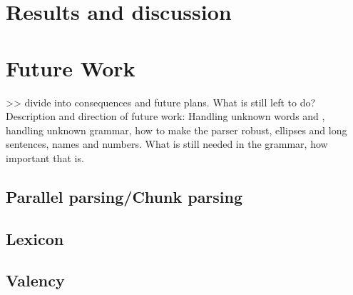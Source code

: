 \documentclass{report}
\begin{document}
\section{Results and discussion}
%
%


\section{Future Work}
\label{sec:future}
>> divide into consequences and future plans.
What is still left to do? Description and direction of future work:
Handling unknown words and , handling unknown grammar, 
how to make the parser robust, ellipses and long sentences, names and numbers.
What is still needed in the grammar, how important that is. 
\subsection{Parallel parsing/Chunk parsing}
\subsection{Lexicon}


\subsection{Valency}
\label{sec:futureValency}
\end{document}
